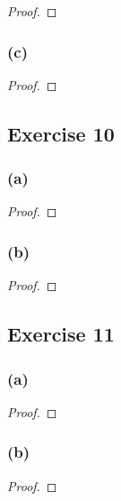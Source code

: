\documentclass[14pt]{extarticle}
\begin{document}
\begin{proof}

\end{proof}

\subsubsection{(c)}

\begin{proof}

\end{proof}

\subsection{Exercise 10}

\subsubsection{(a)}

\begin{proof}

\end{proof}

\subsubsection{(b)}

\begin{proof}

\end{proof}

\subsection{Exercise 11}

\subsubsection{(a)}

\begin{proof}

\end{proof}

\subsubsection{(b)}

\begin{proof}

\end{proof}
\end{document}
